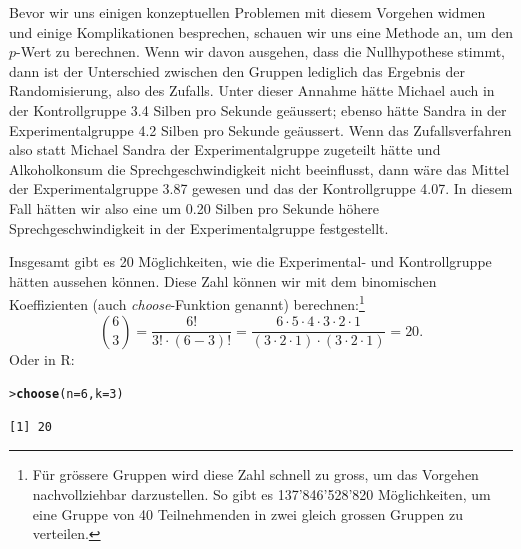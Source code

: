 \documentclass[oneside, 10pt]{book}\usepackage[]{graphicx}\usepackage[]{xcolor}
\makeatletter
\newcommand{\hlnum}[1]{\textcolor[rgb]{0.686,0.059,0.569}{#1}}%
\newcommand{\hlstd}[1]{\textcolor[rgb]{0.345,0.345,0.345}{#1}}%
\newcommand{\hlkwc}[1]{\textcolor[rgb]{0.333,0.667,0.333}{#1}}%
\newcommand{\hlkwd}[1]{\textcolor[rgb]{0.737,0.353,0.396}{\textbf{#1}}}%
\newenvironment{kframe}{%
 \def\at@end@of@kframe{}%
 \ifinner\ifhmode%
  \def\at@end@of@kframe{\end{minipage}}%
  \begin{minipage}{\columnwidth}%
 \fi\fi%
 \def\FrameCommand##1{\hskip\@totalleftmargin \hskip-\fboxsep
 \colorbox{shadecolor}{##1}\hskip-\fboxsep
     \hskip-\linewidth \hskip-\@totalleftmargin \hskip\columnwidth}%
 \MakeFramed {\advance\hsize-\width
   \@totalleftmargin\z@ \linewidth\hsize
   \@setminipage}}%
 {\par\unskip\endMakeFramed%
 \at@end@of@kframe}
\newenvironment{knitrout}{}{} %
\makeatother
\begin{document}
Bevor wir uns einigen konzeptuellen Problemen mit
diesem Vorgehen widmen und einige Komplikationen besprechen,
schauen wir uns eine Methode an, um den $p$-Wert zu berechnen.
Wenn wir davon ausgehen, dass die Nullhypothese stimmt, dann ist
der Unterschied zwischen den Gruppen lediglich das Ergebnis der
Randomisierung, also des Zufalls. Unter dieser Annahme hätte Michael
auch in der Kontrollgruppe 3.4 Silben pro Sekunde geäussert;
ebenso hätte Sandra in der Experimentalgruppe 4.2 Silben pro Sekunde
geäussert. Wenn das Zufallsverfahren also statt Michael Sandra der
Experimentalgruppe zugeteilt hätte
und Alkoholkonsum die Sprechgeschwindigkeit nicht beeinflusst,
dann wäre das Mittel der Experimentalgruppe 3.87 gewesen
und das der Kontrollgruppe 4.07. In diesem Fall hätten wir also
eine um 0.20 Silben pro Sekunde höhere Sprechgeschwindigkeit
in der Experimentalgruppe festgestellt.

Insgesamt gibt es 20 Möglichkeiten, wie die Experimental-
und Kontrollgruppe hätten aussehen können. Diese Zahl können wir
mit dem binomischen Koeffizienten (auch \textit{choose}-Funktion
genannt) berechnen:\footnote{Für grössere
Gruppen wird diese Zahl schnell zu gross, um das Vorgehen
nachvollziehbar darzustellen. So gibt es 137'846'528'820 Möglichkeiten,
um eine Gruppe von 40 Teilnehmenden in zwei gleich grossen
Gruppen zu verteilen.}
\[
  {6\choose 3} = \frac{6!}{3! \cdot (6-3)!} = \frac{6\cdot 5 \cdot 4 \cdot 3 \cdot 2 \cdot 1}{(3 \cdot 2 \cdot 1) \cdot (3 \cdot 2 \cdot 1)} = 20.
\]
Oder in R:
\begin{knitrout}
\color{fgcolor}\begin{kframe}
\begin{alltt}
\hlstd{> }\hlkwd{choose}\hlstd{(}\hlkwc{n} \hlstd{=} \hlnum{6}\hlstd{,} \hlkwc{k} \hlstd{=} \hlnum{3}\hlstd{)}
\end{alltt}
\begin{verbatim}
[1] 20
\end{verbatim}
\end{kframe}
\end{knitrout}
\end{document}
